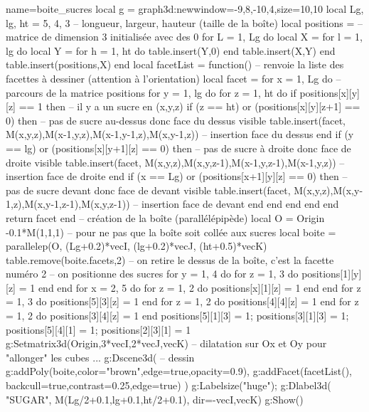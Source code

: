 \documentclass[%
10pt,%
a4paper,%
french,%
]%
{article}%
\newenvironment*{demo}[2][]{%
\gdef\legende{#2}%
\gdef\lab{#1}%
\bgroup
\VerbatimOut{\jobname.tmp}%
}%
{%
\endVerbatimOut%
\egroup%
\inputminted[ignorelexererrors=true,breaklines,bgcolor=Beige,linenos,numbersep=6pt,frame=single,fontsize=\footnotesize]{Lua}{\jobname.tmp}%
\begin{minipage}{0.9\textwidth}
\begin{center}
\captionof{figure}{\legende}\label{\lab}%
%
\end{center}
\end{minipage}
}
\begin{document}
\begin{demo}{Boite de morceaux de sucre}
\begin{luadraw}{name=boite_sucres}
local g = graph3d:new{window={-9,8,-10,4},size={10,10}}
local Lg, lg, ht = 5, 4, 3 -- longueur, largeur, hauteur (taille de la boîte)
local positions = {} -- matrice de dimension 3 initialisée avec des 0
for L = 1, Lg do
    local X = {}
    for l = 1, lg do
        local Y = {}
        for h = 1, ht do table.insert(Y,0) end
        table.insert(X,Y)
    end
    table.insert(positions,X)
end
local facetList = function() -- renvoie la liste des facettes à dessiner (attention à l'orientation)
    local facet = {}
    for x = 1, Lg do -- parcours de la matrice positions
        for y = 1, lg do
            for z = 1, ht do
                if positions[x][y][z] == 1 then -- il y a un sucre en (x,y,z)
                    if (z == ht) or (positions[x][y][z+1] == 0) then -- pas de sucre au-dessus donc face du dessus visible
                        table.insert(facet, {M(x,y,z),M(x-1,y,z),M(x-1,y-1,z),M(x,y-1,z)}) -- insertion face du dessus
                    end
                    if (y == lg) or (positions[x][y+1][z] == 0) then -- pas de sucre à droite donc face de droite visible
                        table.insert(facet, {M(x,y,z),M(x,y,z-1),M(x-1,y,z-1),M(x-1,y,z)}) -- insertion face de droite
                    end
                    if (x == Lg) or (positions[x+1][y][z] == 0) then -- pas de sucre devant donc face de devant visible
                        table.insert(facet, {M(x,y,z),M(x,y-1,z),M(x,y-1,z-1),M(x,y,z-1)}) -- insertion face de devant
                    end
                end
            end
        end
    end
    return facet
end
-- création de la boîte (parallélépipède)
local O = Origin -0.1*M(1,1,1) -- pour ne pas que la boîte soit collée aux sucres
local boite = parallelep(O, (Lg+0.2)*vecI, (lg+0.2)*vecJ, (ht+0.5)*vecK)
table.remove(boite.facets,2) -- on retire le dessus de la boîte, c'est la facette numéro 2
-- on positionne des sucres
for y = 1, 4 do for z = 1, 3 do  positions[1][y][z] = 1 end end
for x = 2, 5 do for z = 1, 2 do positions[x][1][z] = 1 end end
for z = 1, 3 do positions[5][3][z] = 1 end
for z = 1, 2 do positions[4][4][z] = 1 end
for z = 1, 2 do positions[3][4][z] = 1 end
positions[5][1][3] = 1; positions[3][1][3] = 1; positions[5][4][1] = 1; positions[2][3][1] = 1
g:Setmatrix3d({Origin,3*vecI,2*vecJ,vecK}) -- dilatation sur Ox et Oy pour "allonger" les cubes ...
g:Dscene3d( -- dessin
    g:addPoly(boite,{color="brown",edge=true,opacity=0.9}),
    g:addFacet(facetList(), {backcull=true,contrast=0.25,edge=true})    )
g:Labelsize("huge"); g:Dlabel3d( "SUGAR", M(Lg/2+0.1,lg+0.1,ht/2+0.1), {dir={-vecI,vecK}})
g:Show()
\end{luadraw}
\end{demo}
\end{document}
